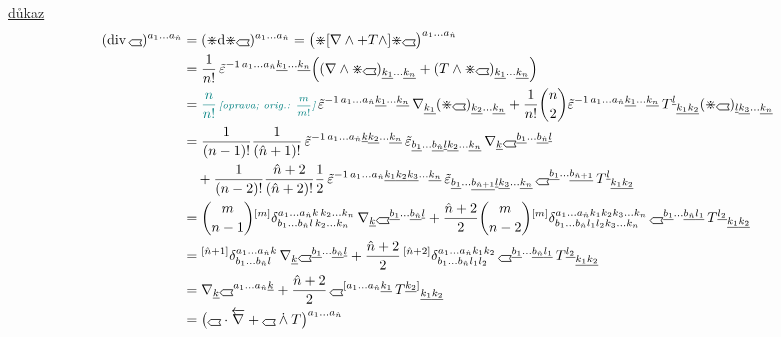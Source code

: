 \underline{důkaz}
\begin{align*}
  (\mathrm{div}\,\gmIhustsym)^{a_1\dots a_{\hat n}}
  &= (\gmIhdual\dd\gmIhdual\gmIhustsym)^{a_1\dots a_{\hat n}} = \big(\gmIhdual[\nabla\wedge + T\wedge]\gmIhdual\gmIhustsym\big)^{a_1\dots a_{\hat n}} \\
  &= \frac1{n!}\,\tilde\varepsilon^{-1\,a_1\dots a_{\hat n}\underline{k_1}\dots\underline{k_n}}
   \Big((\nabla\wedge\gmIhdual\gmIhustsym)_{\underline{k_1}\dots\underline{k_n}} + (T\wedge\gmIhdual\gmIhustsym)_{\underline{k_1}\dots\underline{k_n}}\Big) \\
  &= \oprava{\frac{n}{n!}}{\frac{m}{m!}}\,\tilde\varepsilon^{-1\,a_1\dots a_{\hat n}\underline{k_1}\dots\underline{k_n}}\,\nabla_{\underline{k_1}}(\gmIhdual\gmIhustsym)_{\underline{k_2}\dots\underline{k_n}}
   + \frac1{n!}\binom n2\tilde\varepsilon^{-1\,a_1\dots a_{\hat n}\underline{k_1}\dots\underline{k_n}}\,T^{\underline l}{}_{\underline{k_1}\underline{k_2}}(\gmIhdual\gmIhustsym)_{\underline l\underline{k_3}\dots\underline{k_n}} \\
  &= \frac1{(n-1)!}\frac1{(\hat n+1)!}\,\tilde\varepsilon^{-1\,a_1\dots a_{\hat n}\underline k\underline{k_2}\dots\underline{k_n}}\,\tilde\varepsilon_{\underline{b_1}\dots\underline{b_{\hat n}}\underline l\underline{k_2}\dots\underline{k_n}}\,\nabla_{\underline k}\gmIhustsym^{\underline{b_1}\dots\underline{b_{\hat n}}\underline l} \\
  &\quad + \frac1{(n-2)!}\frac{\hat n+2}{(\hat n+2)!}\frac12\,\tilde\varepsilon^{-1\,a_1\dots a_{\hat n}\underline{k_1}\underline{k_2}\underline{k_3}\dots\underline{k_n}}\,\tilde\varepsilon_{\underline{b_1}\dots\underline{b_{\hat n+1}}\underline l\underline{k_3}\dots\underline{k_n}}\,\gmIhustsym^{\underline{b_1}\dots\underline{b_{\hat n+1}}}\,T^{\underline l}{}_{\underline{k_1}\underline{k_2}} \\
  &= \binom m{n-1}{}^{[m]}\delta^{a_1\dots a_{\hat n}k\,k_2\dots k_n}_{b_1\dots b_{\hat n}l\,k_2\dots k_n}\,\nabla_{\underline k}\gmIhustsym^{\underline{b_1}\dots\underline{b_{\hat n}}\underline l}
   + \frac{\hat n+2}{2}\binom m{n-2}{}^{[m]}\delta^{a_1\dots a_{\hat n}k_1k_2k_3\dots k_n}_{b_1\dots b_{\hat n}l_1l_2k_3\dots k_n}\,\gmIhustsym^{\underline{b_1}\dots\underline{b_{\hat n}}\underline{l_1}}\,T^{\underline{l_2}}{}_{\underline{k_1}\underline{k_2}} \\
  &= {}^{[\hat n+1]}\delta^{a_1\dots a_{\hat n}k}_{b_1\dots b_{\hat n}l}\,\nabla_{\underline k}\gmIhustsym^{\underline{b_1}\dots\underline{b_{\hat n}}\underline l}
   + \frac{\hat n+2}{2}\,{}^{[\hat n+2]}\delta^{a_1\dots a_{\hat n}k_1k_2}_{b_1\dots b_{\hat n}l_1l_2}\,\gmIhustsym^{\underline{b_1}\dots\underline{b_{\hat n}}\underline{l_1}}\,T^{\underline{l_2}}{}_{\underline{k_1}\underline{k_2}} \\
  &= \nabla_{\underline k}\gmIhustsym^{a_1\dots a_{\hat n}\underline k}
   + \frac{\hat n+2}{2}\,\gmIhustsym^{[a_1\dots a_{\hat n}\underline{k_1}}\,T^{\underline{k_2}]}{}_{\underline{k_1}\underline{k_2}} \\
  &= \big(\gmIhustsym\cdot\overleftarrow{\nabla} + \gmIhustsym\gmIdotwedge T\big)^{a_1\dots a_{\hat n}}
\end{align*}

